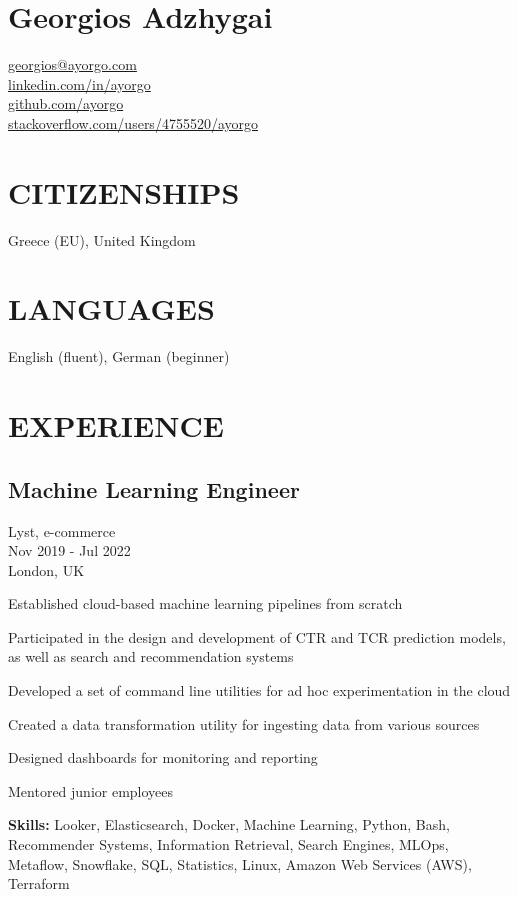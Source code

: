 \documentclass[a4paper,10pt]{article}
\begin{document}
\section*{\Large Georgios Adzhygai}

\begin{tabbing}
\faEnvelope[regular] \= \href{mailto:georgios@ayorgo.com}{georgios@ayorgo.com} \\
\faLinkedin \> \href{https://www.linkedin.com/in/ayorgo}{linkedin.com/in/ayorgo} \\
\faGithub \> \href{https://github.com/ayorgo}{github.com/ayorgo} \\
\faStackOverflow \> \href{https://stackoverflow.com/users/4755520/ayorgo}{stackoverflow.com/users/4755520/ayorgo}
\end{tabbing}

\section*{CITIZENSHIPS}
Greece (EU), United Kingdom

\section*{LANGUAGES}
English (fluent), German (beginner)

\section*{EXPERIENCE}

\subsection*{Machine Learning Engineer}
Lyst, e-commerce \\
Nov 2019 - Jul 2022 \\
London, UK
\begin{bulletlist}
    \item Established cloud-based machine learning pipelines from scratch
    \item Participated in the design and development of CTR and TCR prediction models, as well as search and recommendation systems
    \item Developed a set of command line utilities for ad hoc experimentation in the cloud
    \item Created a data transformation utility for ingesting data from various sources
    \item Designed dashboards for monitoring and reporting
    \item Mentored junior employees
\end{bulletlist}
\textbf{Skills:} Looker, Elasticsearch, Docker, Machine Learning, Python, Bash, Recommender Systems, Information Retrieval, Search Engines, MLOps, Metaflow, Snowflake, SQL, Statistics, Linux, Amazon Web Services (AWS), Terraform
\end{document}
